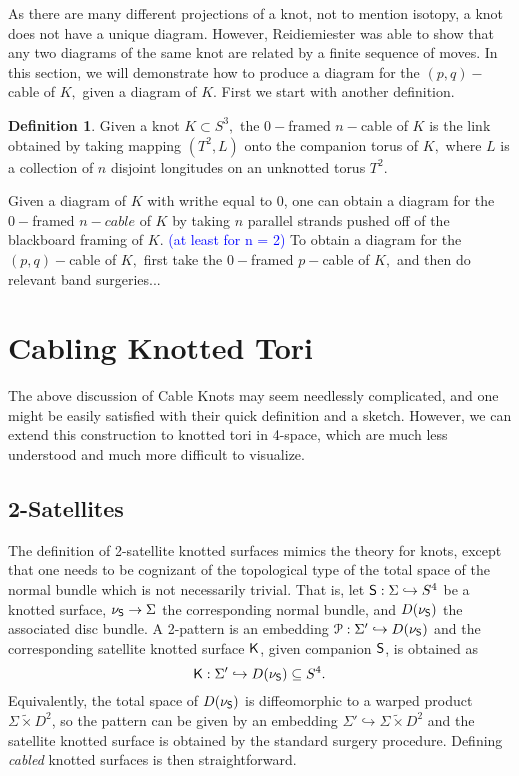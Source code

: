 \documentclass[a4paper, 12 pt, reqno]{amsart}
\theoremstyle{definition}
\newtheorem{definition}[theorem]{Definition}
\theoremstyle{remark}
\begin{document}
As there are many different projections of a knot, not to mention isotopy, a knot does not have a unique diagram. However, Reidiemiester was able to show that any two diagrams of the same knot are related by a finite sequence of moves. In this section, we will demonstrate how to produce a diagram for the $(p,q)-$cable of $K,$ given a diagram of $K.$ First we start with another definition.

\begin{definition}
Given a knot $K \subset S^{3},$ the $0-$framed $n-$cable of $K$ is the link obtained by taking mapping $(T^{2}, L)$ onto the companion torus of $K,$ where $L$ is a collection of $n$ disjoint longitudes on an unknotted torus $T^{2}.$
\end{definition}

Given a diagram of $K$ with writhe equal to $0$, one can obtain a diagram for the $0-$framed $n-cable$ of $K$ by taking $n$ parallel strands pushed off of the blackboard framing of $K.$ \textcolor{blue}{(at least for n = 2)} To obtain a diagram for the $(p, q)-$cable of $K,$ first take the $0-$framed $p-$cable of $K,$ and then do relevant band surgeries...

\section{Cabling Knotted Tori} 
The above discussion of Cable Knots may seem needlessly complicated, and one might be easily satisfied with their quick definition and a sketch. However, we can extend this construction to knotted tori in 4-space, which are much less understood and much more difficult to visualize.  

\subsection{2-Satellites}\label{sect:2sat}



The definition of 2-satellite knotted surfaces mimics the theory for knots, except that one needs to be cognizant of the topological type of the total space of the normal bundle which is not necessarily trivial. That is, let $\mathsf S : \Sigma \hookrightarrow S^4$ be a knotted surface, $\nu_{\mathsf S} \to \Sigma$ the corresponding normal bundle, and $D(\nu_{\mathsf S})$ the associated disc bundle. A 2-pattern is an embedding $\mathcal P : \Sigma' \hookrightarrow D(\nu_{\mathsf S})$ and the corresponding satellite knotted surface $\mathsf K$, given companion $\mathsf S$, is obtained as
\[
\mathsf K : \Sigma' \hookrightarrow D(\nu_{\mathsf S}) \subseteq S^4 .
\]
Equivalently, the total space of $D(\nu_{\mathsf S})$ is diffeomorphic to a warped product $\Sigma \widetilde{\times} D^2$, so the pattern can be given by an embedding $\Sigma' \hookrightarrow \Sigma \widetilde{\times} D^2$ and the satellite knotted surface is obtained by the standard surgery procedure. Defining {\em cabled} knotted surfaces is then straightforward.
\end{document}

